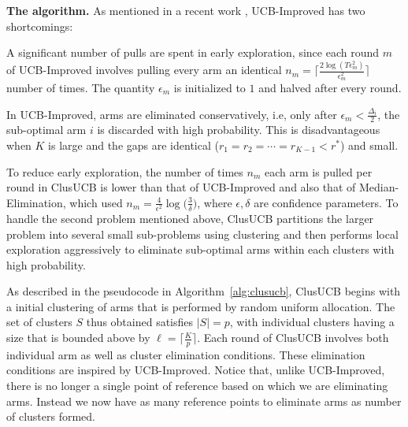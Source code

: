
\textbf{The algorithm.} As mentioned in a recent work \cite{liu2016modification}, UCB-Improved has two shortcomings: 	\\
\begin{inparaenum}[\bfseries(i)]
\item A significant number of pulls are spent in early exploration, since each round $m$ of UCB-Improved involves pulling every arm an identical $n_{m}=\bigg\lceil \frac{ 2\log(T\epsilon^{2}_{m})}{\epsilon^{2}_{m}} \bigg\rceil$ number of times. The quantity $\epsilon_{m}$ is initialized to $1$ and halved after every round.\\
\item In UCB-Improved, arms are eliminated conservatively, i.e, only after $\epsilon_{m}<\frac{\Delta_{i}}{2}$, the sub-optimal arm $i$ is discarded with high probability. This is disadvantageous when $K$ is large and the gaps are identical ($r_{1}=r_{2}=\cdots=r_{K-1}<r^{*}$) and small.\\
\end{inparaenum}
To reduce early exploration, the number of times $n_m$ each arm is pulled per round in ClusUCB is lower than that of UCB-Improved and also that of Median-Elimination, which used $n_m=\frac{4}{\epsilon^{2}}\log\big(\frac{3}{\delta}\big)$, where $\epsilon,\delta$ are confidence parameters.
To handle the second problem mentioned above, ClusUCB partitions the larger problem into several small sub-problems using clustering and then performs local exploration aggressively to eliminate sub-optimal arms within each clusters with high probability.


As described in the pseudocode in Algorithm~\ref{alg:clusucb}, ClusUCB begins with a initial clustering of arms that is performed by random uniform allocation. The set of clusters $S$ thus obtained satisfies $|S|=p$, with individual clusters having a size that is bounded above by $\ell=\big\lceil \frac{K}{p} \big\rceil$.
Each round of ClusUCB involves both individual arm as well as cluster elimination conditions. These elimination conditions are inspired by UCB-Improved. Notice that, unlike UCB-Improved, there is no longer a single point of reference based on which we are eliminating arms. Instead we now have as many reference points to eliminate arms as number of clusters formed. 

